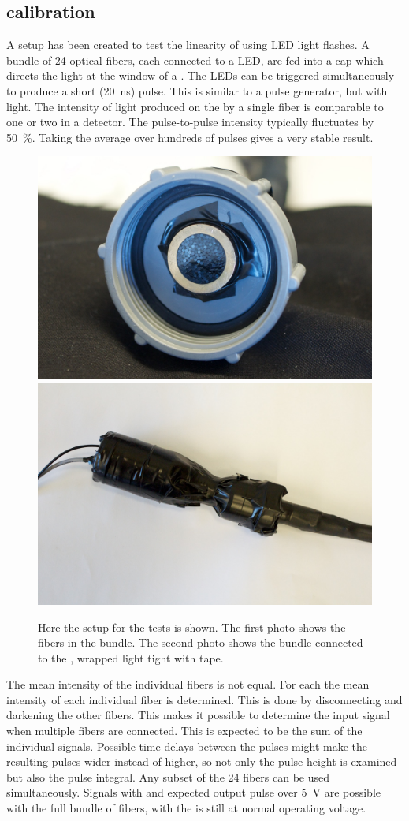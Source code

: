\subsection{\pmt calibration}
\label{sub:pmt_calibration}

A setup has been created to test the linearity of \pmts using LED light flashes. A bundle of 24 optical fibers, each connected to a LED, are fed into a cap which directs the light at the window of a \pmt. The LEDs can be triggered simultaneously to produce a short (\SI{20}{\ns}) pulse. This is similar to a pulse generator, but with light. The intensity of light produced on the \pmt by a single fiber is comparable to one or two \mip in a detector. The pulse-to-pulse intensity typically fluctuates by \SI{50}{\percent}. Taking the average over hundreds of pulses gives a very stable result.

\begin{figure}
    \centering
    \includegraphics[width=.45\linewidth]{plots/station/ARN_085351.jpg}
    \includegraphics[width=.45\linewidth]{plots/station/ARN_085349.jpg}
    \caption{Here the setup for the \pmt tests is shown. The first photo shows the fibers in the bundle. The second photo shows the bundle connected to the \pmt, wrapped light tight with tape.}
    \label{fig:pmt_test_setup}
\end{figure}

The mean intensity of the individual fibers is not equal. For each \pmt the mean intensity of each individual fiber is determined. This is done by disconnecting and darkening the other fibers. This makes it possible to determine the input signal when multiple fibers are connected. This is expected to be the sum of the individual signals. Possible time delays between the pulses might make the resulting pulses wider instead of higher, so not only the pulse height is examined but also the pulse integral. Any subset of the 24 fibers can be used simultaneously. Signals with and expected \pmt output pulse over \SI{5}{\volt} are possible with the full bundle of fibers, with the \pmt is still at normal operating voltage.

